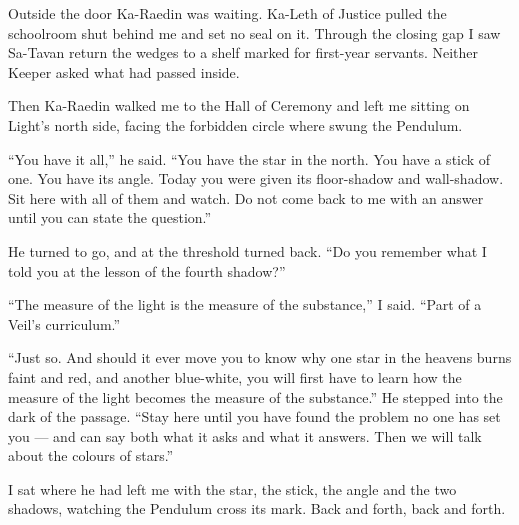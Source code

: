Outside the door Ka-Raedin was waiting. Ka-Leth of Justice pulled the schoolroom shut behind me and set no seal on it. Through the closing gap I saw Sa-Tavan return the wedges to a shelf marked for first-year servants. Neither Keeper asked what had passed inside.\par

Then Ka-Raedin walked me to the Hall of Ceremony and left me sitting on Light's north side, facing the forbidden circle where swung the Pendulum.\par

``You have it all,'' he said. ``You have the star in the north. You have a stick of one. You have its angle. Today you were given its floor-shadow and wall-shadow. Sit here with all of them and watch. Do not come back to me with an answer until you can state the question.''\par

He turned to go, and at the threshold turned back. ``Do you remember what I told you at the lesson of the fourth shadow?''\par

``The measure of the light is the measure of the substance,'' I said. ``Part of a Veil's curriculum.''\par

``Just so. And should it ever move you to know why one star in the heavens burns faint and red, and another blue-white, you will first have to learn how the measure of the light becomes the measure of the substance.'' He stepped into the dark of the passage. ``Stay here until you have found the problem no one has set you --- and can say both what it asks and what it answers. Then we will talk about the colours of stars.''\par

I sat where he had left me with the star, the stick, the angle and the two shadows, watching the Pendulum cross its mark. Back and forth, back and forth.\par
